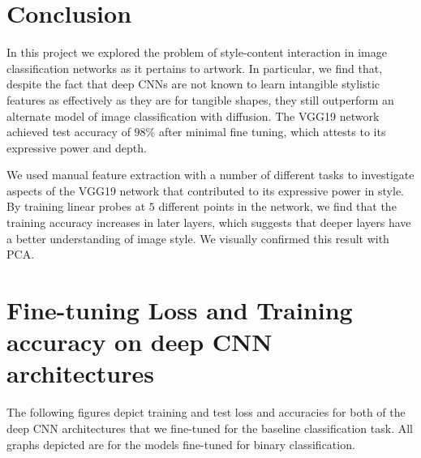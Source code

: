 \documentclass[twocolumn]{article}
\begin{document}
\section{Conclusion}

In this project we explored the problem of style-content interaction in image classification networks as it pertains to artwork. In particular, we find that, despite the fact that deep CNNs are not known to learn intangible stylistic features as effectively as they are for tangible shapes, they still outperform an alternate model of image classification with diffusion. The VGG19 network achieved test accuracy of $98\%$ after minimal fine tuning, which attests to its expressive power and depth. 

We used manual feature extraction with a number of different tasks to investigate aspects of the VGG19 network that contributed to its expressive power in style. By training linear probes at $5$ different points in the network, we find that the training accuracy increases in later layers, which suggests that deeper layers have a better understanding of image style. We visually confirmed this result with PCA.

\onecolumn
\printbibliography
\appendix

\section{Fine-tuning Loss and Training accuracy on deep CNN architectures}\label{sec:loss}

The following figures depict training and test loss and accuracies for both of the deep CNN architectures that we fine-tuned for the baseline classification task. All graphs depicted are for the models fine-tuned for binary classification. 
\end{document}
